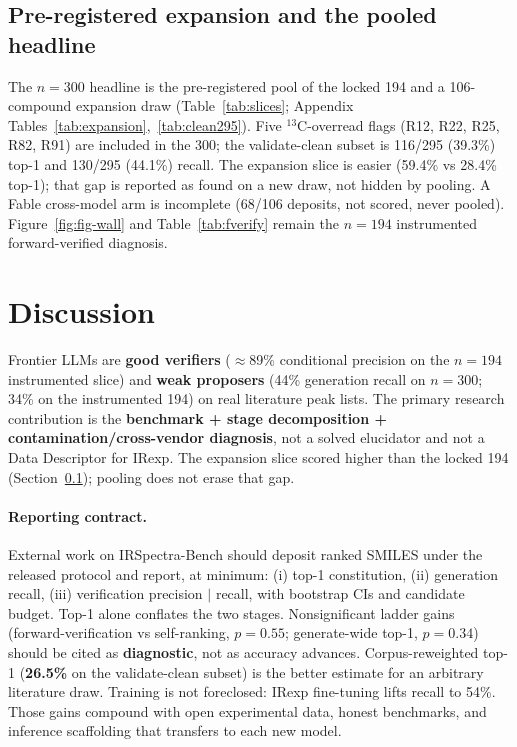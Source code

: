 \documentclass{article}
\begin{document}
\subsection{Pre-registered expansion and the pooled headline}
\label{sec:expansion}

The $n{=}300$ headline is the pre-registered pool of the locked 194 and a 106-compound
expansion draw (Table~\ref{tab:slices}; Appendix Tables~\ref{tab:expansion},~\ref{tab:clean295}).
Five $^{13}$C-overread flags (R12, R22, R25, R82, R91) are included in the 300; the
validate-clean subset is 116/295 (39.3\%) top-1 and 130/295 (44.1\%) recall.
The expansion slice is easier (59.4\% vs 28.4\% top-1); that gap is reported as found on a
new draw, not hidden by pooling.
A Fable cross-model arm is incomplete (68/106 deposits, not scored, never pooled).
Figure~\ref{fig:fig-wall} and Table~\ref{tab:fverify} remain the $n{=}194$ instrumented
forward-verified diagnosis.

\section{Discussion}
\label{sec:discussion}

Frontier LLMs are \textbf{good verifiers} ($\approx$89\% conditional precision on the
$n{=}194$ instrumented slice) and \textbf{weak proposers} (44\% generation recall on
$n{=}300$; 34\% on the instrumented 194) on real literature peak lists.
The primary research contribution is the \textbf{benchmark + stage decomposition +
contamination/cross-vendor diagnosis}, not a solved elucidator and not a Data Descriptor
for IRexp.
The expansion slice scored higher than the locked 194 (Section~\ref{sec:expansion}); pooling
does not erase that gap.

\paragraph{Reporting contract.}
External work on IRSpectra-Bench should deposit ranked SMILES under the released protocol and
report, at minimum: (i) top-1 constitution, (ii) generation recall, (iii) verification
precision $|$ recall, with bootstrap CIs and candidate budget.
Top-1 alone conflates the two stages.
Nonsignificant ladder gains (forward-verification vs self-ranking, $p{=}0.55$; generate-wide
top-1, $p{=}0.34$) should be cited as \textbf{diagnostic}, not as accuracy advances.
Corpus-reweighted top-1 (\textbf{26.5\%} on the validate-clean subset) is the better estimate
for an arbitrary literature draw.
Training is not foreclosed: IRexp fine-tuning lifts recall to 54\%.
Those gains compound with open experimental data, honest benchmarks, and inference scaffolding that
transfers to each new model.
\end{document}
